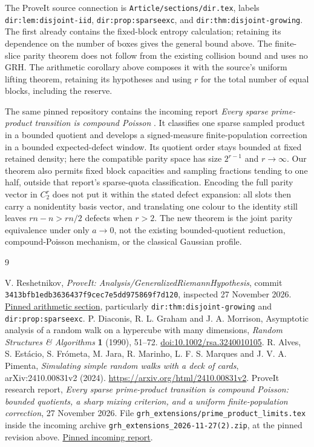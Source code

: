 \documentclass[11pt]{article}
\begin{document}
The ProveIt source connection is
\texttt{Article/sections/dir.tex}, labels
\texttt{dir:lem:disjoint-iid}, \texttt{dir:prop:sparseexc}, and
\texttt{dir:thm:disjoint-growing}. The first already contains the
fixed-block entropy calculation; retaining its dependence on the number
of boxes gives the general bound above. The finite-slice parity theorem
does not follow from the existing collision bound and uses no GRH.
The arithmetic corollary above composes it with the source's uniform
lifting theorem, retaining its hypotheses and using $r$ for the total
number of equal blocks, including the reserve.

The same pinned repository contains the incoming report \emph{Every sparse
prime-product transition is compound Poisson} \cite{IncomingCP}. It classifies
one sparse sampled product in a bounded quotient and develops a signed-measure
finite-population correction in a bounded expected-defect window. Its quotient
order stays bounded at fixed retained density; here the compatible parity
space has size $2^{r-1}$ and $r\to\infty$. Our theorem also permits fixed block
capacities and sampling fractions tending to one half, outside that report's
sparse-quota classification. Encoding the full parity vector in $C_2^r$ does
not put it within the stated defect expansion: all slots then carry a
nonidentity basis vector, and translating one colour to the identity still
leaves $rn-n>rn/2$ defects when $r>2$. The new theorem is the joint parity
equivalence under only $a\to0$, not the existing bounded-quotient reduction,
compound-Poisson mechanism, or the classical Gaussian profile.

\begin{thebibliography}{9}
\raggedright
{}
V. Reshetnikov, \emph{ProveIt: Analysis/GeneralizedRiemannHypothesis},
commit \texttt{3413bfb1edb3636437f9cec7e5dd975869f7d120},
inspected 27 November 2026.
\href{https://github.com/VladimirReshetnikov/ProveIt/blob/3413bfb1edb3636437f9cec7e5dd975869f7d120/Analysis/GeneralizedRiemannHypothesis/Article/sections/dir.tex}{Pinned arithmetic section},
particularly \texttt{dir:thm:disjoint-growing} and
\texttt{dir:prop:sparseexc}.
P. Diaconis, R. L. Graham and J. A. Morrison,
Asymptotic analysis of a random walk on a hypercube with many dimensions,
\emph{Random Structures \& Algorithms} \textbf{1} (1990), 51--72.
\href{https://doi.org/10.1002/rsa.3240010105}{doi:10.1002/rsa.3240010105}.
R. Alves, S. Est\'acio, S. Fr\'ometa, M. Jara, R. Marinho,
L. F. S. Marques and J. V. A. Pimenta,
\emph{Simulating simple random walks with a deck of cards},
arXiv:2410.00831v2 (2024). \url{https://arxiv.org/html/2410.00831v2}.
ProveIt research report, \emph{Every sparse prime-product transition is
compound Poisson: bounded quotients, a sharp mixing criterion, and a uniform
finite-population correction}, 27 November 2026. File
\texttt{grh\_extensions/prime\_product\_limits.tex} inside the incoming archive
\texttt{grh\_extensions\_2026-11-27(2).zip}, at the pinned revision above.
\href{https://github.com/VladimirReshetnikov/ProveIt/blob/3413bfb1edb3636437f9cec7e5dd975869f7d120/Analysis/GeneralizedRiemannHypothesis/docs/incoming/grh_extensions_2026-11-27(2).zip}{Pinned incoming report}.
\end{thebibliography}
\end{document}
